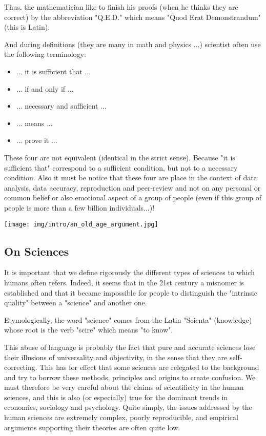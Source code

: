 	Thus, the mathematician like to finish his proofs (when he thinks they are correct) by the abbreviation "Q.E.D." which means "Quod Erat Demonstrandum" (this is Latin).
	
	And during definitions (they are many in math and physics ...) scientist often use the following terminology:
	
	\begin{itemize}
	\item ... it is sufficient that ...
	
	\item ... if and only if ...
	
	\item ... necessary and sufficient ...
	
	\item ... means ...
	
	\item ... prove it ...
	\end{itemize}
	These four are not equivalent (identical in the strict sense). Because "it is sufficient that" correspond to a sufficient condition, but not to a necessary condition. Also it must be notice that these four are place in the context of data analysis, data accuracy, reproduction and peer-review and not on any personal or common belief or also emotional aspect of a group of people (even if this group of people is more than a few billion individuals...)!
	\begin{center}
		\texttt{[image: img/intro/an\_old\_age\_argument.jpg]}
	\end{center}

	\subsection{On Sciences}	
	It is important that we define rigorously the different types of sciences to which humans often refers. Indeed, it seems that in the 21st century a misnomer is established and that it became impossible for people to distinguish the "intrinsic quality" between a "science" and another one.

	\begin{tcolorbox}[title=Remark,colframe=black,arc=10pt]
Etymologically, the word "science" comes from the Latin "Scienta" (knowledge) whose root is the verb "scire" which means "to know".
	\end{tcolorbox}

This abuse of language is probably the fact that pure and accurate sciences lose their illusions of universality and objectivity, in the sense that they are self-correcting. This has for effect that some sciences are relegated to the background and try to borrow these methods, principles and origins to create confusion. We must therefore be very careful about the claims of scientificity in the human sciences, and this is also (or especially) true for the dominant trends in economics, sociology and psychology. Quite simply, the issues addressed by the human sciences are extremely complex, poorly reproducible, and empirical arguments supporting their theories are often quite low.

